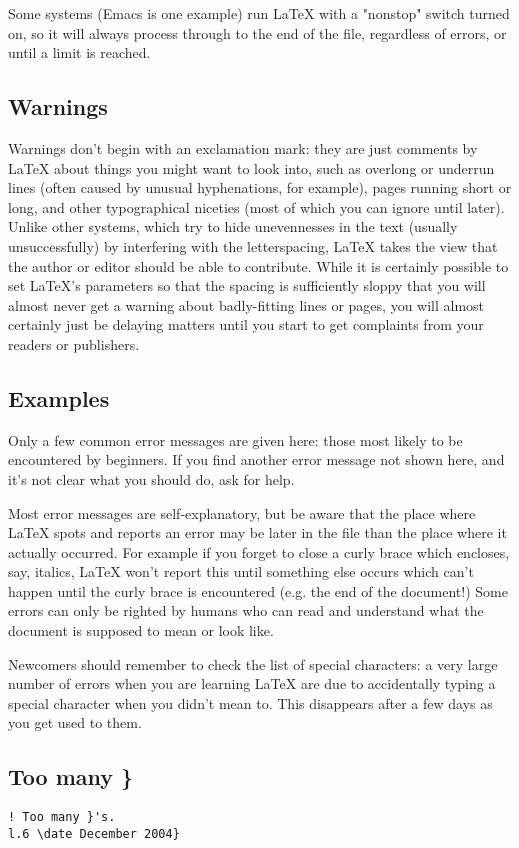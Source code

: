 Some systems (Emacs is one example) run LaTeX with a "nonstop" switch turned on, so it will always process through to the end of the file, regardless of errors, or until a limit is reached.

\subsection{Warnings}
Warnings don't begin with an exclamation mark: they are just comments by LaTeX
about things you might want to look into, such as overlong or underrun lines
(often caused by unusual hyphenations, for example), pages running short or
long, and other typographical niceties (most of which you can ignore until
later).  Unlike other systems, which try to hide unevennesses in the text
(usually unsuccessfully) by interfering with the letterspacing, LaTeX takes the
view that the author or editor should be able to contribute. While it is
certainly possible to set LaTeX's parameters so that the spacing is
sufficiently sloppy that you will almost never get a warning about
badly-fitting lines or pages, you will almost certainly just be delaying
matters until you start to get complaints from your readers or publishers.

\subsection{Examples}
Only a few common error messages are given here: those most likely to be
encountered by beginners. If you find another error message not shown here, and
it's not clear what you should do, ask for help.

Most error messages are self-explanatory, but be aware that the place where
LaTeX spots and reports an error may be later in the file than the place where
it actually occurred. For example if you forget to close a curly brace which
encloses, say, italics, LaTeX won't report this until something else occurs
which can't happen until the curly brace is encountered (e.g. the end of the
document!) Some errors can only be righted by humans who can read and
understand what the document is supposed to mean or look like.

Newcomers should remember to check the list of special characters: a very large
number of errors when you are learning LaTeX are due to accidentally typing a
special character when you didn't mean to. This disappears after a few days as
you get used to them.

\subsection{Too many \} }
\begin{verbatim}
! Too many }'s.
l.6 \date December 2004}

\end{verbatim}

